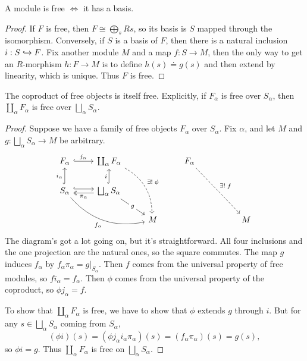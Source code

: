 \documentclass[twoside,10pt]{report}
\begin{document}
\begin{thrm}[]
A module is free $\iff$ it has a basis.
\end{thrm}
\begin{proof}
	If $F$ is free, then $F\cong \bigoplus_{s}Rs$, so its basis is $S$ mapped through the isomorphism. Conversely, if $S$ is a basis of $F$, then there is a natural inclusion $i:S \hookrightarrow F$. Fix another module $M$ and a map $f:S\to M$, then the only way to get an $R$-morphism $h:F\to M$ is to define $h(s) \doteq g(s)$ and then extend by linearity, which is unique. Thus $F$ is free.
\end{proof}


\begin{thrm}[]
	The coproduct of free objects is itself free. Explicitly, if $F_{\alpha}$ is free over $S_{\alpha}$, then $\coprod_{\alpha} F_{\alpha}$ is free over $\bigsqcup_\alpha S_{\alpha}$.
\end{thrm}
\begin{proof}
	Suppose we have a family of free objects $F_{\alpha}$ over $S_{\alpha}$. Fix $\alpha$, and let $M$ and $g:\bigsqcup_\alpha S_{\alpha}\to M$ be arbitrary.
	\[
		\begin{tikzcd}
F_\alpha \arrow[r, "j_\alpha", hook]                                                                  &  \coprod_{\alpha} F_\alpha \arrow[rdd, "\exists!\;\phi", dashed, bend left]                                                        &   & F_\alpha \arrow[rrdd, "\exists!\;f", dashed] &  &   \\
S_\alpha \arrow[rrd, "f_\alpha"', bend right] \arrow[u, "i_\alpha", hook] \arrow[r, hook, shift left] & \bigsqcup_\alpha S_\alpha \arrow[u, "i", hook] \arrow[rd, "g" description] \arrow[l, "\pi_\alpha", two heads, shift left] &   &                                              &  &   \\
                                                                                                      &                                                                                                                                   & M &                                              &  & M
\end{tikzcd}
	\] The diagram's got a lot going on, but it's straightforward. All four inclusions and the one projection are the natural ones, so the square commutes. The map $g$ induces $f_{\alpha}$ by $f_{\alpha}\pi_{\alpha}=g|_{S_{\alpha}}$. Then $f$ comes from the universal property of free modules, so $f i_{\alpha}=f_{\alpha}$. Then $\phi$ comes from the universal property of the coproduct, so $\phi j_{\alpha}=f$.

	To show that $\coprod_{\alpha} F_{\alpha}$ is free, we have to show that $\phi$ extends $g$ through $i$. But for any $s \in \bigsqcup_\alpha S_{\alpha}$ coming from $S_{\alpha}$,
	\[
		(\phi i)(s) = (\phi j_{\alpha} i_{\alpha} \pi_{\alpha})(s) = (f_{\alpha}\pi_{\alpha})(s) = g(s),
	\] 
	so $\phi i=g$. Thus $\coprod_{\alpha} F_{\alpha}$ is free on $\bigsqcup_\alpha S_{\alpha}$.
\end{proof}
\end{document}
